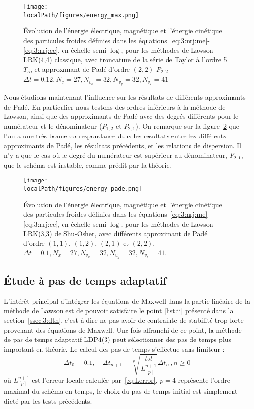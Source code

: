 \begin{figure}[h]
  \centering
  \texttt{[image: \\localPath/figures/energy\_max.png]}
  \caption{Évolution de l'énergie électrique, magnétique et l'énergie cinétique des particules froides définies dans les équations~\ref{eq:3:nrj:me}-\ref{eq:3:nrj:ce}, en échelle semi-$\log$, pour les méthodes de Lawson LRK(4,4) classique, avec troncature de la série de Taylor à l'ordre 5 $T_5$, et approximant de Padé d'ordre $(2,2)$ $P_{2,2}$. $\Delta t = 0.12, N_x=27, N_{v_x}=32, N_{v_y}=32, N_{v_z}=41$.}
  \label{fig:approx:energies:cfl}
\end{figure}

Nous étudions maintenant l'influence sur les résultats de différents approximants de Padé. En particulier nous testons des ordres inférieurs à la méthode de Lawson, ainsi que des approximants de Padé avec des degrés différents pour le numérateur et le dénominateur ($P_{1,2}$ et $P_{2,1}$). On remarque sur la figure~\ref{fig:approx:energies:pade} que l'on a une très bonne correspondance dans les résultats entre les différents approximants de Padé, les résultats précédents, et les relations de dispersion. Il n'y a que le cas où le degré du numérateur est supérieur au dénominateur, $P_{2,1}$, que le schéma est instable, comme prédit par la théorie. 

\begin{figure}[h]
  \centering
  \texttt{[image: \\localPath/figures/energy\_pade.png]}
  \caption{Évolution de l'énergie électrique, magnétique et l'énergie cinétique des particules froides définies dans les équations~\ref{eq:3:nrj:me}-\ref{eq:3:nrj:ce}, en échelle semi-$\log$, pour les méthodes de Lawson LRK(3,3) de Shu-Osher, avec différents approximant de Padé d'ordre $(1,1)$, $(1,2)$, $(2,1)$ et $(2,2)$. $\Delta t = 0.1, N_x=27, N_{v_x}=32, N_{v_y}=32, N_{v_z}=41$.}
  \label{fig:approx:energies:pade}
\end{figure}


\FloatBarrier
\subsection{Étude à pas de temps adaptatif}

L'intérêt principal d'intégrer les équations de Maxwell dans la partie linéaire de la méthode de Lawson est de pouvoir satisfaire le point \ref{list:ii} présenté dans la section~\ref{ssec:3:dtn}, c'est-à-dire ne pas avoir de contrainte de stabilité trop forte provenant des équations de Maxwell. Une fois affranchi de ce point, la méthode de pas de temps adaptatif LDP4(3) peut sélectionner des pas de temps plus important en théorie. Le calcul des pas de temps s'effectue sans limiteur :
$$
  \Delta t_0 = 0.1,\quad \Delta t_{n+1} = \sqrt[p]{\frac{tol}{L_{[p]}^{n+1}}}\Delta t_n\ ,n\geq 0
$$
où $L_{[p]}^{n+1}$ est l'erreur locale calculée par~\ref{eq:Lerror}, $p=4$ représente l'ordre maximal du schéma en temps, le choix du pas de temps initial est simplement dicté par les tests précédents.

